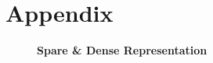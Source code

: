 \documentclass[12pt,letterpaper]{article}
\begin{document}
\section{Appendix}

\begin{figure}[!tbp]
  \begin{subfigure}[b]{0.49\textwidth}
    \label{fig:f1}
  \end{subfigure}
  \hfill
  \begin{subfigure}[b]{0.49\textwidth}
    \label{fig:f2}
  \end{subfigure}
  \caption{\bf Spare \& Dense Representation}
\end{figure}


\end{document}
